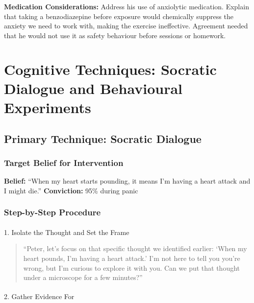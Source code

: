 \documentclass[
  american,
  11pt,
  11pt,
  letterpaper,
  onecolumn]{article}
\makeatletter
\let\oldparagraph\paragraph
\renewcommand{\paragraph}{
    \@ifstar
      \xxxParagraphStar
      \xxxParagraphNoStar
  }
\newcommand{\xxxParagraphStar}[1]{\oldparagraph*{#1}\mbox{}}
\newcommand{\xxxParagraphNoStar}[1]{\oldparagraph{#1}\mbox{}}
\makeatother
\begin{document}
\textbf{Medication Considerations:} Address his use of anxiolytic
medication. Explain that taking a benzodiazepine before exposure would
chemically suppress the anxiety we need to work with, making the
exercise ineffective. Agreement needed that he would not use it as
safety behaviour before sessions or homework.

\section{Cognitive Techniques: Socratic Dialogue and Behavioural
Experiments}\label{cognitive-techniques-socratic-dialogue-and-behavioural-experiments}

\subsection{Primary Technique: Socratic
Dialogue}\label{primary-technique-socratic-dialogue}

\subsubsection{Target Belief for
Intervention}\label{target-belief-for-intervention}

\textbf{Belief:} ``When my heart starts pounding, it means I'm having a
heart attack and I might die.'' \textbf{Conviction:} 95\% during panic

\subsubsection{Step-by-Step Procedure}\label{step-by-step-procedure}

\paragraph{1. Isolate the Thought and Set the
Frame}\label{isolate-the-thought-and-set-the-frame}

\begin{quote}
``Peter, let's focus on that specific thought we identified earlier:
`When my heart pounds, I'm having a heart attack.' I'm not here to tell
you you're wrong, but I'm curious to explore it with you. Can we put
that thought under a microscope for a few minutes?''
\end{quote}

\paragraph{2. Gather Evidence For}\label{gather-evidence-for}
\end{document}
